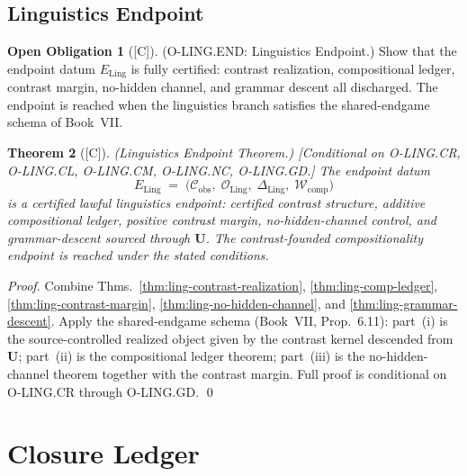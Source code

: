 \documentclass[12pt,oneside]{amsbook}
\theoremstyle{plain}
\newtheorem{theorem}{Theorem}[section]
\theoremstyle{definition}
\newtheorem{obligation}[theorem]{Open Obligation}
\theoremstyle{remark}
\newcommand{\status}[1]{\textup{[#1]}}
\begin{document}
\subsection{Linguistics Endpoint}\label{sec:ling-END}

\begin{obligation}[\status{C}]\label{ob:ling-END}
\textup{(O-LING.END: Linguistics Endpoint.)}
Show that the endpoint datum $E_{\mathrm{Ling}}$ is fully certified:
contrast realization, compositional ledger, contrast margin, no-hidden
channel, and grammar descent all discharged. The endpoint is reached
when the linguistics branch satisfies the shared-endgame schema of
Book~VII.
\end{obligation}

\begin{theorem}[\status{C}]\label{thm:ling-endpoint}
\textup{(Linguistics Endpoint Theorem.)}
\textup{[Conditional on O-LING.CR, O-LING.CL, O-LING.CM, O-LING.NC,
O-LING.GD.]}
The endpoint datum
\[
 E_{\mathrm{Ling}} \;=\;
 \bigl(\mathcal{C}_{\mathrm{obs}},\;
 \mathcal{O}_{\mathrm{Ling}},\;
 \Delta_{\mathrm{Ling}},\;
 \mathcal{W}_{\mathrm{comp}}\bigr)
\]
is a certified lawful linguistics endpoint: certified contrast
structure, additive compositional ledger, positive contrast margin,
no-hidden-channel control, and grammar-descent sourced through
$\mathbf{U}$. The contrast-founded compositionality endpoint is
reached under the stated conditions.
\end{theorem}

\begin{proof}
Combine Thms.~\ref{thm:ling-contrast-realization},
\ref{thm:ling-comp-ledger}, \ref{thm:ling-contrast-margin},
\ref{thm:ling-no-hidden-channel}, and
\ref{thm:ling-grammar-descent}. Apply the shared-endgame schema
(Book~VII, Prop.~6.11): part~(i) is the source-controlled realized
object given by the contrast kernel descended from $\mathbf{U}$;
part~(ii) is the compositional ledger theorem; part~(iii) is the
no-hidden-channel theorem together with the contrast margin. Full
proof is conditional on O-LING.CR through O-LING.GD.
\qed
\end{proof}

\section{Closure Ledger}\label{sec:ling-closure}
\end{document}
